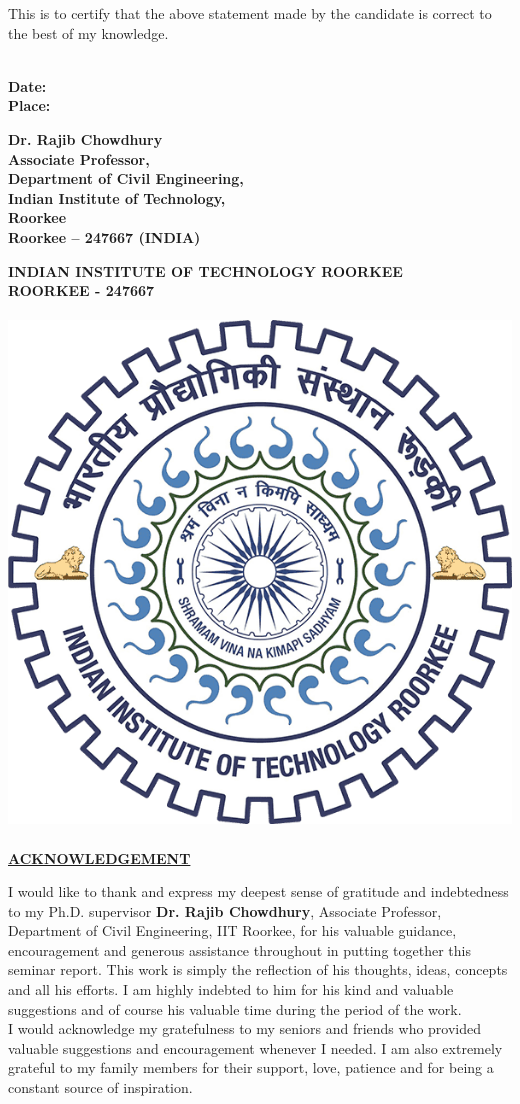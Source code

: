 \documentclass[12pt]{article}
\begin{document}
{\begin{center}
\end{center}
This is to certify that the above statement made by the candidate is correct to the best of my
knowledge.\\~\\
\begin{minipage}[t]{5cm}\bf
    \flushleft
    Date:\\Place:\\
    \end{minipage}
    \hfill
    \begin{minipage}[t]{10cm}\bf
    \flushright
    Dr. Rajib Chowdhury
\\Associate Professor,
\\Department of Civil Engineering,
\\Indian Institute of Technology,
\\Roorkee
\\Roorkee – 247667 (INDIA)\\
    \end{minipage}

\pagebreak
\begin{center}
    \textbf{ \LARGE   INDIAN INSTITUTE OF TECHNOLOGY ROORKEE\\
    ROORKEE - 247667\\~\\
    \includegraphics[width=.3\textwidth]{iitr.png}\\~\\
    \underline{ACKNOWLEDGEMENT}\\}
    \end{center}
    \begin{doublespace}
        {\large I would like to thank and express my deepest sense of gratitude and indebtedness to my Ph.D.
        supervisor \textbf{Dr. Rajib Chowdhury}, Associate Professor, Department of Civil Engineering, IIT
        Roorkee, for his valuable guidance, encouragement and generous assistance throughout in
        putting together this seminar report. This work is simply the reflection of his thoughts, ideas,
        concepts and all his efforts. I am highly indebted to him for his kind and valuable suggestions
        and of course his valuable time during the period of the work.\\
        I would acknowledge my gratefulness to my seniors and friends who provided valuable
        suggestions and encouragement whenever I needed. I am also extremely grateful to my family
        members for their support, love, patience and for being a constant source of inspiration.\\~\\
        }    
    \end{doublespace}

}
\end{document}
